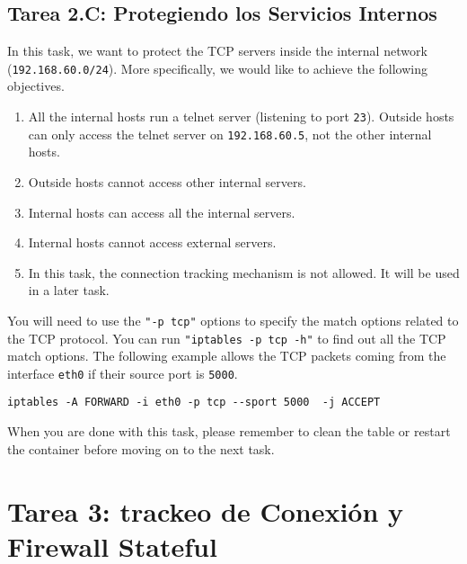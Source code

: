 \subsection{Tarea 2.C: Protegiendo los Servicios Internos}

In this task, we want to protect the TCP servers 
inside the internal network (\texttt{192.168.60.0/24}). 
More specifically, we would like to achieve the following objectives.

\begin{enumerate}[noitemsep]
  \item All the internal hosts run a telnet server (listening to port \texttt{23}). 
    Outside hosts can only access the telnet server on \texttt{192.168.60.5},
    not the other internal hosts.

  \item Outside hosts cannot access other internal servers. 

  \item Internal hosts can access all the internal servers.

  \item Internal hosts cannot access external servers.

  \item In this task, the connection tracking mechanism is not allowed. 
    It will be used in a later task. 
\end{enumerate}

You will need to use the \texttt{"-p tcp"} options to specify the match
options related to the TCP protocol. You can run 
\texttt{"iptables -p tcp -h"} to find out all the TCP match
options. The following example allows the TCP packets coming from
the interface \texttt{eth0} if their source port is \texttt{5000}.  

\begin{lstlisting}
iptables -A FORWARD -i eth0 -p tcp --sport 5000  -j ACCEPT
\end{lstlisting}


When you are done with this task,
please remember to clean the table or restart the container 
before moving on to the next task.




\section{Tarea 3: trackeo de Conexión y Firewall Stateful}


